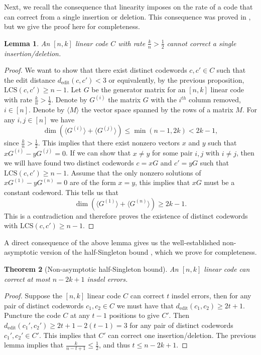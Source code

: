 \documentclass[draft, onecolumn, 11pt]{IEEEtran}
\newtheorem{theorem}{Theorem}[]
\newtheorem{lemma}[theorem]{Lemma}
\begin{document}
Next, we recall the consequence that linearity imposes on the rate of a code that can correct from a single insertion or deletion. This consequence was proved in \cite{abdel2007linear}, but we give the proof here for completeness.

\begin{lemma}
	An $[n,k]$ linear code $C$ with rate $\frac{k}{n} > \frac{1}{2}$ cannot correct a single insertion/deletion.
\end{lemma}

\begin{proof}
	We want to show that there exist distinct codewords $c,c' \in C$ such that the edit distance $d_{\mathrm{edit}}(c,c') < 3$ or equivalently, by the previous proposition, $\mathrm{LCS}(c,c') \geq n-1$.
	Let $G$ be the generator matrix for an $[n,k]$ linear code with rate $\frac{k}{n} > \frac{1}{2}$.
	Denote by $G^{(i)}$ the matrix $G$ with the $i^{th}$ column removed, $i \in [n]$. Denote by $\langle M \rangle$ the vector space spanned by the rows of a matrix $M$. 
	For any $i,j \in [n]$ we have $$\dim (\langle G^{(i)}\rangle  + \langle G^{(j)}\rangle) \leq \min(n-1,2k) < 2k - 1,$$ since $\frac{k}{n} > \frac{1}{2}$. This implies that there exist nonzero vectors $x$ and $y$ such that $xG^{(i)} - yG^{(j)} = 0$. 
	If we can show that $x \neq y$ for some pair $i,j$ with $i \neq j$, then we will have found two distinct codewords $c = xG$ and $c' = yG$ such that $\mathrm{LCS}(c,c') \geq n-1$.
	Assume that the only nonzero solutions of $xG^{(1)} - yG^{(n)} = 0$ are of the form $x = y$, this implies that $xG$ must be a constant codeword. This tells us that $$\dim (\langle G^{(1)}\rangle  + \langle G^{(n)}\rangle) \geq 2k-1.$$ 
    This is a contradiction and therefore proves the existence of distinct codewords with $\mathrm{LCS}(c,c') \geq n - 1$. 
\end{proof}

A direct consequence of the above lemma gives us the well-established non-asymptotic version of the half-Singleton bound \cite{cheng2020efficient}, which we prove for completeness.

\begin{theorem}[Non-asymptotic half-Singleton bound]
    An $[n,k]$ linear code can correct at most $n-2k + 1$ insdel errors.
\end{theorem}

\begin{proof}
    Suppose the $[n,k]$ linear code $C$ can correct $t$ insdel errors, then for any pair of distinct codewords $c_1,c_2 \in C$ we must have that $d_{\mathrm{edit}}(c_1,c_2) \geq 2t + 1$. Puncture the code $C$ at any $t - 1$ positions to give $C'$. Then $d_{\mathrm{edit}}(c_1',c_2') \geq 2t + 1 - 2(t-1) = 3$ for any pair of distinct codewords $c_1',c_2' \in C'$. This implies that $C'$ can correct one insertion/deletion. 
    The previous lemma implies that $\frac{k}{n-t+1} \leq \frac{1}{2}$, and thus $t \leq n - 2k + 1$.
\end{proof}
\end{document}
